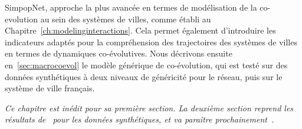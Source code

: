 SimpopNet, approche la plus avancée en termes de modélisation de la co-evolution au sein des systèmes de villes, comme établi au Chapitre~\ref{ch:modelinginteractions}. Cela permet également d'introduire les indicateurs adaptés pour la compréhension des trajectoires des systèmes de villes en termes de dynamiques co-évolutives. Nous décrivons ensuite en~\ref{sec:macrocoevol} le modèle générique de co-évolution, qui est testé sur des données synthétiques à deux niveaux de généricité pour le réseau, puis sur le système de ville français.




\stars


\textit{Ce chapitre est inédit pour sa première section. La deuxième section reprend les résultats de~\cite{} %
pour les données synthétiques, et va paraître prochainement~\cite{}. %
}















